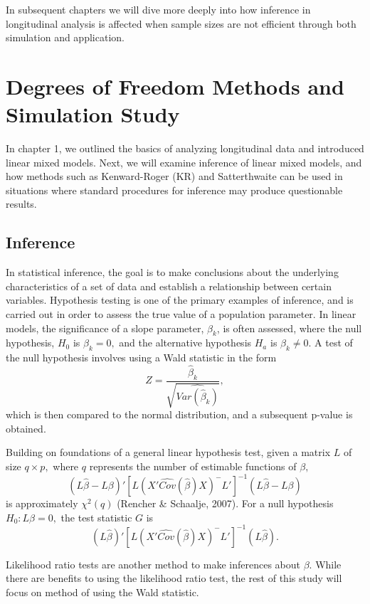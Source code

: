 \documentclass[12pt, twoside]{amherstthesis}
\begin{document}
In subsequent chapters we will dive more deeply into how inference in longitudinal analysis is affected when sample sizes are not efficient through both simulation and application.

\hypertarget{rmd-basics}{%
\chapter{Degrees of Freedom Methods and Simulation Study}\label{rmd-basics}}

In chapter 1, we outlined the basics of analyzing longitudinal data and introduced linear mixed models. Next, we will examine inference of linear mixed models, and how methods such as Kenward-Roger (KR) and Satterthwaite can be used in situations where standard procedures for inference may produce questionable results.

\hypertarget{inference}{%
\section{Inference}\label{inference}}

In statistical inference, the goal is to make conclusions about the underlying characteristics of a set of data and establish a relationship between certain variables. Hypothesis testing is one of the primary examples of inference, and is carried out in order to assess the true value of a population parameter. In linear models, the significance of a slope parameter, \(\beta_k\), is often assessed, where the null hypothesis, \(H_0\) is \(\beta_k = 0,\) and the alternative hypothesis \(H_a\) is \(\beta_k \neq 0.\) A test of the null hypothesis involves using a Wald statistic in the form \[ Z = \frac{\hat\beta_k}{\sqrt{\widehat{Var(\hat\beta_k)}}},\] which is then compared to the normal distribution, and a subsequent p-value is obtained.

Building on foundations of a general linear hypothesis test, given a matrix \(L\) of size \(q \times p,\) where \(q\) represents the number of estimable functions of \(\beta,\) \[(L\hat\beta-L\beta)'[L(X'\widehat {Cov}(\hat\beta)X)^-L']^{-1}(L\hat\beta-L\beta)
\] is approximately \(\chi^2(q)\) (Rencher \& Schaalje, 2007). For a null hypothesis \(H_0: L\beta = 0,\) the test statistic \(G\) is \[(L\hat\beta)'[L(X'\widehat {Cov}(\hat\beta)X)^-L']^{-1}(L\hat\beta).\]

Likelihood ratio tests are another method to make inferences about \(\beta\). While there are benefits to using the likelihood ratio test, the rest of this study will focus on method of using the Wald statistic.
\end{document}
